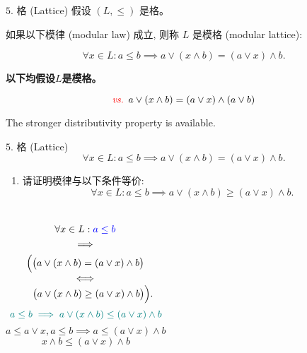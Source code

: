 \begin{frame}{}
  \begin{exampleblock}{$5.$ 格 (Lattice)}
    假设 $(L, \le)$ 是格。

    如果以下模律 (modular law) 成立, 则称 $L$ 是模格 (modular lattice):

    \[
      \forall x \in L: a \le b \implies a \lor (x \land b) = (a \lor x) \land b.
    \]

    \textbf{以下均假设$L$是模格。}
  \end{exampleblock}


  \pause
  \[
    \textcolor{red}{\emph{vs. }} a \lor (x \land b) = (a \lor x) \land (a \lor b)
  \]

  \pause
  \vspace{0.40cm}
  \centerline{The stronger distributivity property is  available.}
\end{frame}

\begin{frame}{}
  \begin{exampleblock}{$5.$ 格 (Lattice)}
    \[
      \forall x \in L: a \le b \implies a \lor (x \land b) = (a \lor x) \land b.
    \]

    \begin{enumerate}[(1)]
      \item 请证明模律与以下条件等价:
	\[
	  \forall x \in L: a \le b \implies a \lor (x \land b) \ge (a \lor x) \land b.
	\]
    \end{enumerate}
  \end{exampleblock}

  \begin{columns}
      \pause
      \begin{gather*}
	\forall x \in L: \textcolor{blue}{a \le b} \\
	\implies \\
	\Big(\big(a \lor (x \land b) = (a \lor x) \land b\big) \\[-0.8ex]
	\iff \\[-0.8ex]
	\quad\;\;\big(a \lor (x \land b) \ge (a \lor x) \land b\big)\Big).
      \end{gather*}
      \pause
      \[
	\textcolor{teal}{a \le b \implies a \lor (x \land b) \le (a \lor x) \land b}
      \]
      \pause
      \[
	a \le a \lor x, a \le b \implies a \le (a \lor x) \land b
      \]
      \pause
      \[
	x \land b \le (a \lor x) \land b
      \]
  \end{columns}
\end{frame}

